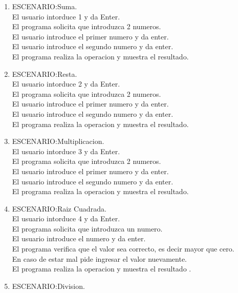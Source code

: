 \documentclass[a4paper,12pt]{article}
\begin{document}
   \begin{enumerate}
    \item ESCENARIO:Suma.\\
    El usuario intorduce 1 y da Enter.\\
    El programa solicita que introduzca 2 numeros.\\
    El usuario introduce el primer numero y da enter.\\
    El usuario introduce el segundo numero y da enter.\\
    El programa realiza la operacion y muestra el resultado.\\
     \item ESCENARIO:Resta.\\
    El usuario intorduce 2 y da Enter.\\
    El programa solicita que introduzca 2 numeros.\\
    El usuario introduce el primer numero y da enter.\\
    El usuario introduce el segundo numero y da enter.\\
    El programa realiza la operacion y muestra el resultado.\\
    \item ESCENARIO:Multiplicacion.\\
    El usuario intorduce 3 y da Enter.\\
    El programa solicita que introduzca 2 numeros.\\
    El usuario introduce el primer numero y da enter.\\
    El usuario introduce el segundo numero y da enter.\\
    El programa realiza la operacion y muestra el resultado.\\
    \item ESCENARIO:Raiz Cuadrada.\\
    El usuario intorduce 4 y da Enter.\\
    El programa solicita que introduzca un numero.\\
    El usuario introduce el numero y da enter.\\
    El programa verifica que el valor sea correcto, es decir mayor que cero.\\
    En caso de estar mal pide ingresar el valor nuevamente.\\
    El programa realiza la operacion y muestra el resultado .\\
    \item ESCENARIO:Division.\\

\end{enumerate}
\end{document}
